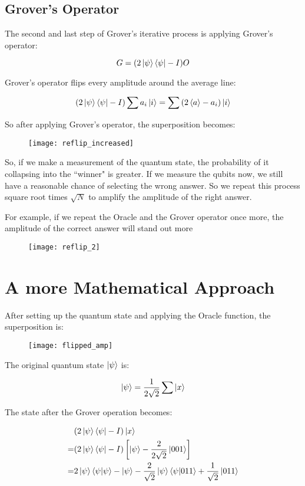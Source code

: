 \documentclass[a4paper]{article}
\begin{document}
\subsection{ Grover's Operator }
The second and last step of Grover's iterative process is applying Grover's operator:

$$ G = (2\ket{\psi}\bra{\psi} - I)O $$

Grover's operator flips every amplitude around the average line:

$$ (2\ket{\psi}\bra{\psi} - I)\sum{a_i \ket{i}} = \sum{(2\braket{a} - a_i)\ket{i}} $$

So after applying Grover's operator, the superposition becomes:

\begin{figure}[h]
\texttt{[image: reflip\_increased]}
\centering
\end{figure}

So, if we make a measurement of the quantum state, the probability of it
collapsing into the ``winner" is greater. If we measure the qubits now, we
still have a reasonable chance of selecting the wrong answer. So we repeat this
process square root times $\sqrt{N}$ to amplify the amplitude of the right answer.

\pagebreak

For example, if we repeat the Oracle and the Grover operator once more, the
amplitude of the correct answer will stand out more

\begin{figure}[h]
\texttt{[image: reflip\_2]}
\centering
\end{figure}

\section{ A more Mathematical Approach }

After setting up the quantum state and applying the Oracle function, the 
superposition is:

\begin{figure}[h]
\texttt{[image: flipped\_amp]}
\centering
\end{figure}

\par

The original quantum state $\ket{\psi}$ is:

$$ \ket{\psi} = \frac{1}{2\sqrt{2}}\sum{\ket{x}} $$

\par

The state after the Grover operation becomes:

\begin{align*}
    & (2\ket{\psi}\bra{\psi} - I)\ket{x} \\
    = & (2\ket{\psi}\bra{\psi} - I) \left[ \ket{\psi} - \frac{2}{2\sqrt{2}}\ket{001} \right] \\
    = & 2\ket{\psi}\braket{\psi|\psi} - \ket{\psi} - \frac{2}{\sqrt{2}}\ket{\psi}\braket{\psi|011} + \frac{1}{\sqrt{2}}\ket{011}
\end{align*}
\end{document}
